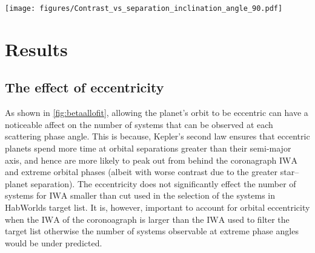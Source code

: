\documentclass[
    usenatbib,
]{mnras}
\newcommand{\todo}[1]{\textcolor{red}{[#1]}}
\newcommand{\timmy}[1]{\textcolor{red}{[\textbf{Timmy:} #1]}} %
\newcommand{\IWA}{\ensuremath{\mathrm{IWA}}}
\newcommand{\hwo}{HabWorlds}
\begin{document}
\begin{figure*}%
   \centering
   \texttt{[image: figures/Contrast\_vs\_separation\_inclination\_angle\_90.pdf]}
   \caption{
    The reflected light contrast and orbital separation of an Earth-like planet with an ocean surface and patchy clouds over a planetary orbit assuming an orbital inclination of $90^\circ$ for the stars $\alpha$ Cen A, $\epsilon$ Eri and Lalande 21185.
    The solid line indicates the contrast in unpolarised light with the contrast at quadrature marked by a solid dot.
    The polarised component is indicated by the colored dots for which the color represents the scattering phase angle from quadrature.
    The light grey points show the quadrature contrasts of the other targets in the star list and the dashed lines indicate $1,2$ and $3$ times the \IWA{} for \hwo.
    }
    \label{fig:contrasts}
\end{figure*}


\section{Results}



\subsection{The effect of eccentricity}
\label{sec:result_eccentricity}
As shown in \cref{fig:betaallofit}, allowing the planet's orbit to be eccentric can have a noticeable affect on the number of systems that can be observed at each scattering phase angle.
%
This is because, Kepler's second law ensures that eccentric planets spend more time at orbital separations greater than their semi-major axis, and hence are more likely to peak out from behind the coronagraph \IWA{} and extreme orbital phases (albeit with worse contrast due to the greater star--planet separation).
%
The eccentricity does not significantly effect the number of systems for \IWA{} smaller than cut used in the selection of the systems in \hwo{} target list. It is, however, important to account for orbital eccentricity when the \IWA{} of the coronoagraph is larger than the \IWA{} used to filter the target list otherwise the number of systems observable at extreme phase angles would be under predicted.
\end{document}
